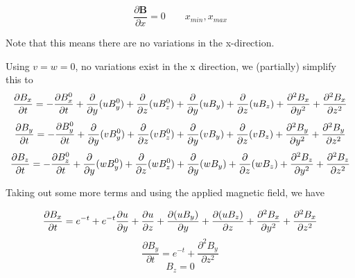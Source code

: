 \documentclass[11pt]{article}
\begin{document}
\begin{equation}
	\frac{\partial \pmb{B}}{\partial x} = 0
	\qquad
	x_{min}, x_{max}
\end{equation}

Note that this means there are no variations in the x-direction. 

Using $v=w=0$, no variations exist in the x direction, we (partially) simplify this to
\begin{equation}
	\frac{\partial B_x}{\partial t} 
	=
	-\frac{\partial B_x^0}{\partial t}
	+\frac{\partial}{\partial y} (u B_y^0) 
	+\frac{\partial}{\partial z} (u B_z^0) \\
	+\frac{\partial}{\partial y} (u B_y) 
	+\frac{\partial}{\partial z} (u B_z) 
	+\frac{\partial^2 B_x}{\partial y^2} 
	+\frac{\partial^2 B_x}{\partial z^2} 
\end{equation}
\begin{equation}
	\frac{\partial B_y}{\partial t} 
	=
	-\frac{\partial B_y^0}{\partial t}
	+\frac{\partial}{\partial y} (v B_y^0) 
	+\frac{\partial}{\partial z} (v B_z^0) \\
	+\frac{\partial}{\partial y} (v B_y) 
	+\frac{\partial}{\partial z} (v B_z) 
	+\frac{\partial^2 B_y}{\partial y^2} 
	+\frac{\partial^2 B_y}{\partial z^2} 
\end{equation}
\begin{equation}
	\frac{\partial B_z}{\partial t} 
	=
	-\frac{\partial B_z^0}{\partial t}
	+\frac{\partial}{\partial y} (w B_y^0) 
	+\frac{\partial}{\partial z} (w B_z^0) \\
	+\frac{\partial}{\partial y} (w B_y) 
	+\frac{\partial}{\partial z} (w B_z) 
	+\frac{\partial^2 B_z}{\partial y^2} 
	+\frac{\partial^2 B_z}{\partial z^2} 
\end{equation}

Taking out some more terms and using the applied magnetic field, we have

\begin{equation}
	\frac{\partial B_x}{\partial t} 
	=
	e^{-t}
	+e^{-t}\frac{\partial u}{\partial y} 
	+\frac{\partial u}{\partial z} \\
	+\frac{\partial (u B_y)}{\partial y} 
	+\frac{\partial (u B_z)}{\partial z} 
	+\frac{\partial^2 B_x}{\partial y^2} 
	+\frac{\partial^2 B_x}{\partial z^2} 
\end{equation}
\begin{equation}
	\frac{\partial B_y}{\partial t} 
	=
	e^{-t}
	+\frac{\partial^2 B_y}{\partial z^2} 
\end{equation}
\begin{equation}
	B_z = 0
\end{equation}
\end{document}
